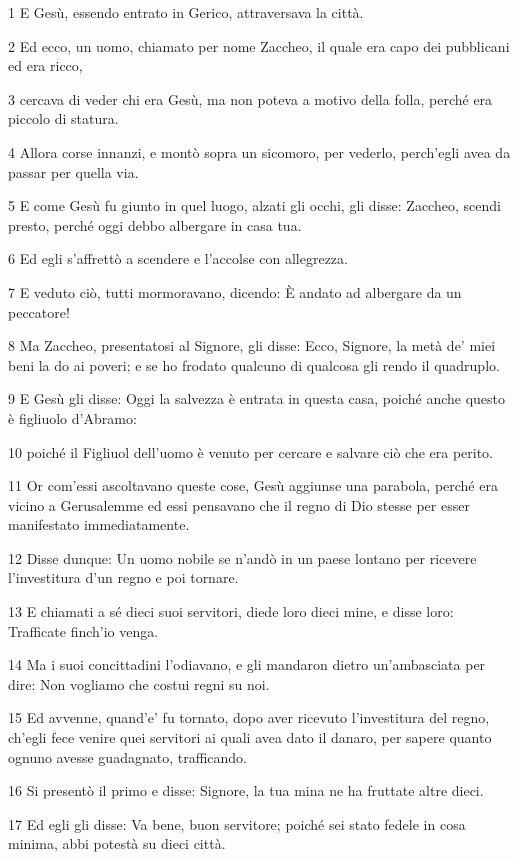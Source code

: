 \par 1 E Gesù, essendo entrato in Gerico, attraversava la città.
\par 2 Ed ecco, un uomo, chiamato per nome Zaccheo, il quale era capo dei pubblicani ed era ricco,
\par 3 cercava di veder chi era Gesù, ma non poteva a motivo della folla, perché era piccolo di statura.
\par 4 Allora corse innanzi, e montò sopra un sicomoro, per vederlo, perch'egli avea da passar per quella via.
\par 5 E come Gesù fu giunto in quel luogo, alzati gli occhi, gli disse: Zaccheo, scendi presto, perché oggi debbo albergare in casa tua.
\par 6 Ed egli s'affrettò a scendere e l'accolse con allegrezza.
\par 7 E veduto ciò, tutti mormoravano, dicendo: È andato ad albergare da un peccatore!
\par 8 Ma Zaccheo, presentatosi al Signore, gli disse: Ecco, Signore, la metà de' miei beni la do ai poveri; e se ho frodato qualcuno di qualcosa gli rendo il quadruplo.
\par 9 E Gesù gli disse: Oggi la salvezza è entrata in questa casa, poiché anche questo è figliuolo d'Abramo:
\par 10 poiché il Figliuol dell'uomo è venuto per cercare e salvare ciò che era perito.
\par 11 Or com'essi ascoltavano queste cose, Gesù aggiunse una parabola, perché era vicino a Gerusalemme ed essi pensavano che il regno di Dio stesse per esser manifestato immediatamente.
\par 12 Disse dunque: Un uomo nobile se n'andò in un paese lontano per ricevere l'investitura d'un regno e poi tornare.
\par 13 E chiamati a sé dieci suoi servitori, diede loro dieci mine, e disse loro: Trafficate finch'io venga.
\par 14 Ma i suoi concittadini l'odiavano, e gli mandaron dietro un'ambasciata per dire: Non vogliamo che costui regni su noi.
\par 15 Ed avvenne, quand'e' fu tornato, dopo aver ricevuto l'investitura del regno, ch'egli fece venire quei servitori ai quali avea dato il danaro, per sapere quanto ognuno avesse guadagnato, trafficando.
\par 16 Si presentò il primo e disse: Signore, la tua mina ne ha fruttate altre dieci.
\par 17 Ed egli gli disse: Va bene, buon servitore; poiché sei stato fedele in cosa minima, abbi potestà su dieci città.
